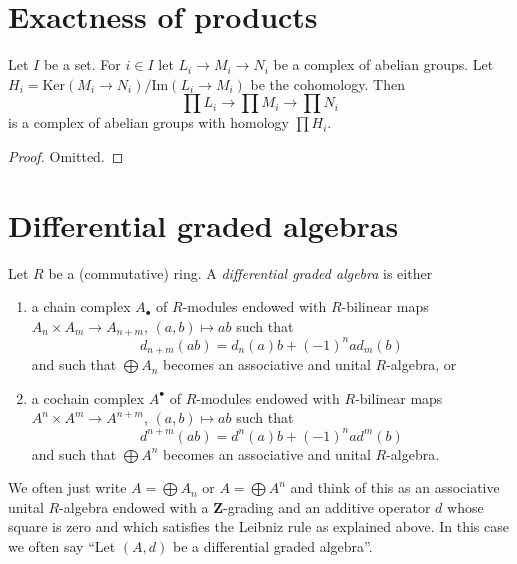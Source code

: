 \section{Exactness of products}
\label{section-product-exact}


\begin{lemma}
\label{lemma-product-abelian-groups-exact}
Let $I$ be a set. For $i \in I$ let $L_i \to M_i \to N_i$ be a complex
of abelian groups. Let $H_i = \text{Ker}(M_i \to N_i)/\text{Im}(L_i \to M_i)$
be the cohomology. Then
$$
\prod L_i \to \prod M_i \to \prod N_i
$$
is a complex of abelian groups with homology $\prod H_i$.
\end{lemma}

\begin{proof}
Omitted.
\end{proof}






\section{Differential graded algebras}
\label{section-dga}

\begin{definition}
\label{definition-dga}
Let $R$ be a (commutative) ring.
A {\it differential graded algebra} is either
\begin{enumerate}
\item a chain complex $A_\bullet$ of $R$-modules endowed with
$R$-bilinear maps $A_n \times A_m \to A_{n + m}$,
$(a, b) \mapsto ab$ such that
$$
d_{n + m}(ab) = d_n(a)b + (-1)^n ad_m(b)
$$
and such that $\bigoplus A_n$ becomes an associative and unital
$R$-algebra, or
\item a cochain complex $A^\bullet$ of $R$-modules endowed with
$R$-bilinear maps $A^n \times A^m \to A^{n + m}$, $(a, b) \mapsto ab$
such that
$$
d^{n + m}(ab) = d^n(a)b + (-1)^n ad^m(b)
$$
and such that $\bigoplus A^n$ becomes an associative and unital $R$-algebra.
\end{enumerate}
\end{definition}

\noindent
We often just write $A = \bigoplus A_n$ or $A = \bigoplus A^n$ and
think of this as an associative unital $R$-algebra endowed with a
$\mathbf{Z}$-grading and an additive operator $d$ whose square is zero and
which satisfies the Leibniz rule as explained above. In this case
we often say ``Let $(A, d)$ be a differential graded algebra''.

